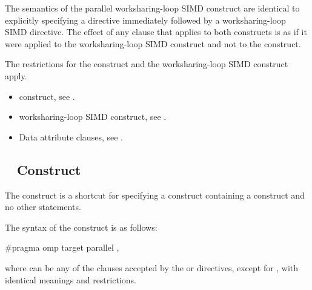 \descr
The semantics of the parallel worksharing-loop SIMD construct are identical to explicitly specifying
a  directive immediately followed by a worksharing-loop SIMD directive. The effect of
any clause that applies to both constructs is as if it were applied to the
worksharing-loop SIMD
construct and not to the  construct.

\restrictions
The restrictions for the  construct and the worksharing-loop SIMD construct apply.

\crossreferences
\begin{itemize}
\item {} construct, see
.

\item worksharing-loop SIMD construct, see
.

\item Data attribute clauses, see
.
\end{itemize}









\subsection{~ Construct}
\label{subsec:target parallel Construct}
\summary
The   construct is a shortcut for specifying a 
construct containing a  construct and no other statements.

\syntax
\begin{ccppspecific}
The syntax of the   construct is as follows:

\begin{ompcPragma}
#pragma omp target parallel \plc{[clause[ [},\plc{] clause] ... ] new-line}
\end{ompcPragma}

where  can be any of the clauses accepted by the  or
 directives, except for , with identical meanings and restrictions.
\end{ccppspecific}

